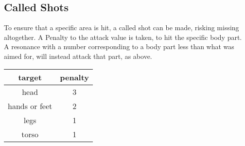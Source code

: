 \subsection{Called Shots}\label{subsec:combat-calledshots}
To ensure that a specific area is hit, a called shot can be made, risking missing altogether.
A Penalty to the attack value is taken, to hit the specific body part.
A resonance with a number corresponding to a body part less than what was aimed for,
will instead attack that part, as above.

\begin{tabular}{cc}
    target & penalty\\\hline
    head & 3 \\
    hands or feet & 2 \\
    legs & 1 \\
    torso& 1
\end{tabular}


